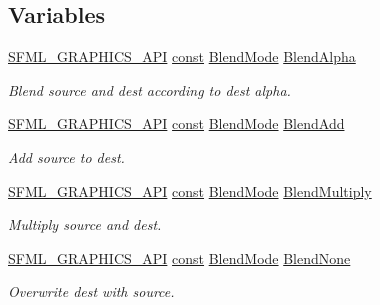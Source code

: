 \subsection*{Variables}
\begin{DoxyCompactItemize}
\item 
\hyperlink{sfml_2dep_2_s_f_m_l-2_84_82_2include_2_s_f_m_l_2_graphics_2_export_8hpp_ab84c9f1035e146917de3bc0f98d72b35}{S\-F\-M\-L\-\_\-\-G\-R\-A\-P\-H\-I\-C\-S\-\_\-\-A\-P\-I} \hyperlink{term__entry_8h_a57bd63ce7f9a353488880e3de6692d5a}{const} \hyperlink{structsf_1_1_blend_mode}{Blend\-Mode} \hyperlink{namespacesf_a7747d95d2e1f108142ea7c760c0b266c}{Blend\-Alpha}
\begin{DoxyCompactList}\small\item\em Blend source and dest according to dest alpha. \end{DoxyCompactList}\item 
\hyperlink{sfml_2dep_2_s_f_m_l-2_84_82_2include_2_s_f_m_l_2_graphics_2_export_8hpp_ab84c9f1035e146917de3bc0f98d72b35}{S\-F\-M\-L\-\_\-\-G\-R\-A\-P\-H\-I\-C\-S\-\_\-\-A\-P\-I} \hyperlink{term__entry_8h_a57bd63ce7f9a353488880e3de6692d5a}{const} \hyperlink{structsf_1_1_blend_mode}{Blend\-Mode} \hyperlink{namespacesf_a1be8c314242e6ed161af2aea08be543c}{Blend\-Add}
\begin{DoxyCompactList}\small\item\em Add source to dest. \end{DoxyCompactList}\item 
\hyperlink{sfml_2dep_2_s_f_m_l-2_84_82_2include_2_s_f_m_l_2_graphics_2_export_8hpp_ab84c9f1035e146917de3bc0f98d72b35}{S\-F\-M\-L\-\_\-\-G\-R\-A\-P\-H\-I\-C\-S\-\_\-\-A\-P\-I} \hyperlink{term__entry_8h_a57bd63ce7f9a353488880e3de6692d5a}{const} \hyperlink{structsf_1_1_blend_mode}{Blend\-Mode} \hyperlink{namespacesf_ad8622674d06322d447de6ea0c95c83b4}{Blend\-Multiply}
\begin{DoxyCompactList}\small\item\em Multiply source and dest. \end{DoxyCompactList}\item 
\hyperlink{sfml_2dep_2_s_f_m_l-2_84_82_2include_2_s_f_m_l_2_graphics_2_export_8hpp_ab84c9f1035e146917de3bc0f98d72b35}{S\-F\-M\-L\-\_\-\-G\-R\-A\-P\-H\-I\-C\-S\-\_\-\-A\-P\-I} \hyperlink{term__entry_8h_a57bd63ce7f9a353488880e3de6692d5a}{const} \hyperlink{structsf_1_1_blend_mode}{Blend\-Mode} \hyperlink{namespacesf_aaa5511bd6fcf3573d61945b6d70a20ab}{Blend\-None}
\begin{DoxyCompactList}\small\item\em Overwrite dest with source. \end{DoxyCompactList}\end{DoxyCompactItemize}


